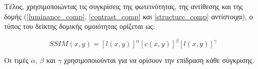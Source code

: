 \documentclass[a4paper,12pt]{article}
\begin{document}
Τέλος, χρησιμοποιώντας τις συγκρίσεις της φωτεινότητας, της αντίθεσης και της
δομής (\eqref{luminance_comp}, \eqref{contrast_comp} και \eqref{structure_comp}
αντίστοιχα), ο τύπος του δείκτης δομικής ομοιότητας ορίζεται ως:

\begin{equation*}
    SSIM(x,y) = \left[l(x,y)\right]^\alpha \left[c(x,y)\right]^\beta 
                \left[l(x,y)\right]^\gamma
\end{equation*}

Οι τιμές $\alpha$, $\beta$ και $\gamma$ χρησιμοποιούνται για
να ορίσουν την επίδραση κάθε σύγκρισης.

\newpage

\printbibliography
\end{document}
